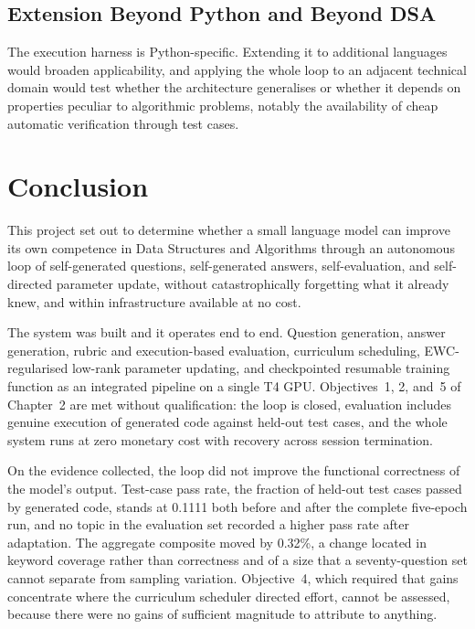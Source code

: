 \documentclass[12pt,a4paper]{report}
\begin{document}
\section{Extension Beyond Python and Beyond DSA}

The execution harness is Python-specific. Extending it to additional languages would broaden applicability, and applying the whole loop to an adjacent technical domain would test whether the architecture generalises or whether it depends on properties peculiar to algorithmic problems, notably the availability of cheap automatic verification through test cases.

\chapter{Conclusion}

This project set out to determine whether a small language model can improve its own competence in Data Structures and Algorithms through an autonomous loop of self-generated questions, self-generated answers, self-evaluation, and self-directed parameter update, without catastrophically forgetting what it already knew, and within infrastructure available at no cost.

The system was built and it operates end to end. Question generation, answer generation, rubric and execution-based evaluation, curriculum scheduling, EWC-regularised low-rank parameter updating, and checkpointed resumable training function as an integrated pipeline on a single T4 GPU. Objectives~1, 2, and~5 of Chapter~2 are met without qualification: the loop is closed, evaluation includes genuine execution of generated code against held-out test cases, and the whole system runs at zero monetary cost with recovery across session termination.

On the evidence collected, the loop did not improve the functional correctness of the model's output. Test-case pass rate, the fraction of held-out test cases passed by generated code, stands at 0.1111 both before and after the complete five-epoch run, and no topic in the evaluation set recorded a higher pass rate after adaptation. The aggregate composite moved by 0.32\%, a change located in keyword coverage rather than correctness and of a size that a seventy-question set cannot separate from sampling variation. Objective~4, which required that gains concentrate where the curriculum scheduler directed effort, cannot be assessed, because there were no gains of sufficient magnitude to attribute to anything.
\end{document}
